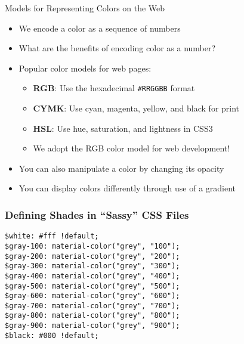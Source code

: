 \documentclass[14pt,aspectratio=169]{beamer}
\begin{document}
%
\begin{frame}{Models for Representing Colors on the Web}
  \begin{itemize}
    \item We encode a color as a sequence of numbers
      \vspace*{-.2in}
    \item What are the benefits of encoding color as a number?
      \vspace*{-.2in}
    \item Popular color models for web pages:
      \begin{itemize}
        \item {\bf RGB}: Use the hexadecimal {\tt \#RRGGBB} format
        \item {\bf CYMK}: Use cyan, magenta, yellow, and black for print
        \item {\bf HSL}: Use hue, saturation, and lightness in CSS3
        \item We adopt the RGB color model for web development!
      \end{itemize}
      \vspace*{-.25in}
    \item You can also manipulate a color by changing its opacity
      \vspace*{-.25in}
    \item You can display colors differently through use of a gradient
  \end{itemize}
\end{frame}

%
\begin{frame}[fragile]
  \frametitle{Defining Shades in ``Sassy'' CSS Files}
  \normalsize
  \begin{minipage}{6in}
    \vspace*{.1in}
    \begin{verbatim}
$white: #fff !default;
$gray-100: material-color("grey", "100");
$gray-200: material-color("grey", "200");
$gray-300: material-color("grey", "300");
$gray-400: material-color("grey", "400");
$gray-500: material-color("grey", "500");
$gray-600: material-color("grey", "600");
$gray-700: material-color("grey", "700");
$gray-800: material-color("grey", "800");
$gray-900: material-color("grey", "900");
$black: #000 !default;
    \end{verbatim}
  \end{minipage}
\end{frame}
\end{document}
